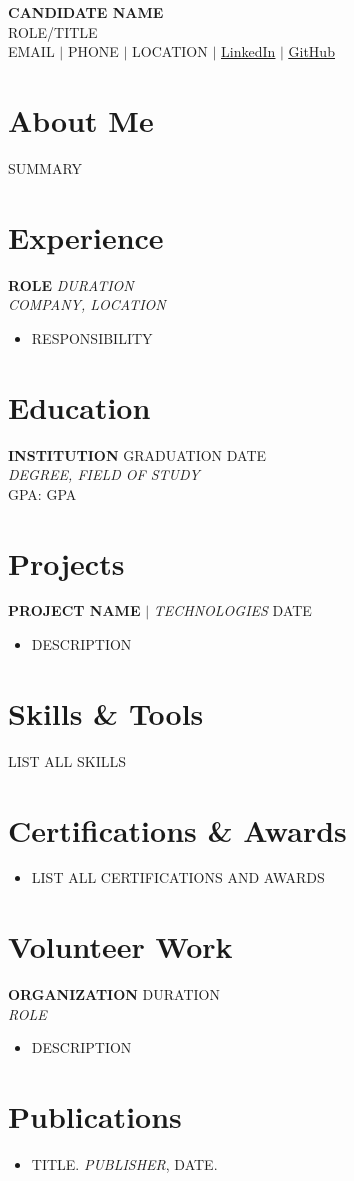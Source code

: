 \documentclass[letterpaper,10pt]{article}
\newcommand{\resumeItem}[1]{\item\small{#1\vspace{-2pt}}}
\newcommand{\resumeItemListStart}{\begin{itemize}[leftmargin=*,topsep=0pt]}
\newcommand{\resumeItemListEnd}{\end{itemize}\vspace{-4pt}}
\begin{document}
\noindent\colorbox{darkbg}{%
  \parbox{\dimexpr\linewidth-2\fboxsep}{%
    \vspace{8pt}
    \begin{center}
      {\Huge\bfseries\color{lighttext} CANDIDATE NAME} \\ \vspace{4pt}
      {\color{accentorange}\large ROLE/TITLE} \\ \vspace{4pt}
      {\small\color{lighttext} EMAIL $|$ PHONE $|$ LOCATION $|$
      \href{LINKEDIN}{\color{lighttext}\underline{LinkedIn}} $|$
      \href{GITHUB}{\color{lighttext}\underline{GitHub}}}
    \end{center}
    \vspace{8pt}
  }%
}

\vspace{8pt}

\section{About Me}
SUMMARY

\section{Experience}
\textbf{ROLE} \hfill \textit{DURATION} \\
\textit{COMPANY, LOCATION}
\resumeItemListStart
  \resumeItem{RESPONSIBILITY}
\resumeItemListEnd

\section{Education}
\textbf{INSTITUTION} \hfill GRADUATION DATE \\
\textit{DEGREE, FIELD OF STUDY} \\
\small GPA: GPA

\section{Projects}
\textbf{PROJECT NAME} $|$ \textit{TECHNOLOGIES} \hfill DATE
\resumeItemListStart
  \resumeItem{DESCRIPTION}
\resumeItemListEnd

\section{Skills \& Tools}
\small LIST ALL SKILLS

\section{Certifications \& Awards}
\resumeItemListStart
  \resumeItem{LIST ALL CERTIFICATIONS AND AWARDS}
\resumeItemListEnd

\section{Volunteer Work}
\textbf{ORGANIZATION} \hfill DURATION \\
\textit{ROLE}
\resumeItemListStart
  \resumeItem{DESCRIPTION}
\resumeItemListEnd

\section{Publications}
\resumeItemListStart
  \resumeItem{TITLE. \textit{PUBLISHER}, DATE.}
\resumeItemListEnd
\end{document}
